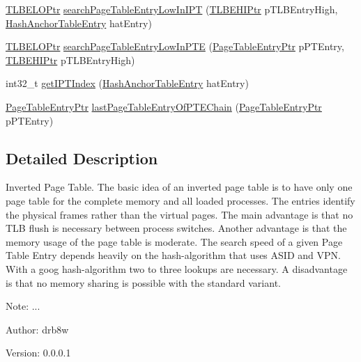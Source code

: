 \begin{CompactItemize}
\item 
\hyperlink{struct_t_l_b_e_l_o}{TLBELOPtr} \hyperlink{group___v_m_m___i_p_t_ga1a233ecd4f829d64f29c55c5c2b369b}{searchPageTableEntryLowInIPT} (\hyperlink{struct_t_l_b_e_h_i}{TLBEHIPtr} pTLBEntryHigh, \hyperlink{group___v_m_m___h_a_t_g06b98a0b294446afee1b27a04682d7c2}{HashAnchorTableEntry} hatEntry)
\item 
\hyperlink{struct_t_l_b_e_l_o}{TLBELOPtr} \hyperlink{group___v_m_m___i_p_t_g4d5cd060a657ba3d732c739461a583a9}{searchPageTableEntryLowInPTE} (\hyperlink{struct_page_table_entry}{PageTableEntryPtr} pPTEntry, \hyperlink{struct_t_l_b_e_h_i}{TLBEHIPtr} pTLBEntryHigh)
\item 
int32\_\-t \hyperlink{group___v_m_m___i_p_t_g84c6b60a0c0d560611edc86fd07a072f}{getIPTIndex} (\hyperlink{group___v_m_m___h_a_t_g06b98a0b294446afee1b27a04682d7c2}{HashAnchorTableEntry} hatEntry)
\item 
\hyperlink{struct_page_table_entry}{PageTableEntryPtr} \hyperlink{group___v_m_m___i_p_t_g5bf5d5affcca902498ae333f71928885}{lastPageTableEntryOfPTEChain} (\hyperlink{struct_page_table_entry}{PageTableEntryPtr} pPTEntry)
\end{CompactItemize}


\subsection{Detailed Description}
Inverted Page Table. The basic idea of an inverted page table is to have only one page table for the complete memory and all loaded processes. The entries identify the physical frames rather than the virtual pages. The main advantage is that no TLB flush is necessary between process switches. Another advantage is that the memory usage of the page table is moderate. The search speed of a given Page Table Entry depends heavily on the hash-algorithm that uses ASID and VPN. With a goog hash-algorithm two to three lookups are necessary. A disadvantage is that no memory sharing is possible with the standard variant. 

\begin{Desc}
\item[Note:]... \end{Desc}
\begin{Desc}
\item[Author:]drb8w \end{Desc}
\begin{Desc}
\item[Version:]0.0.0.1 \end{Desc}


